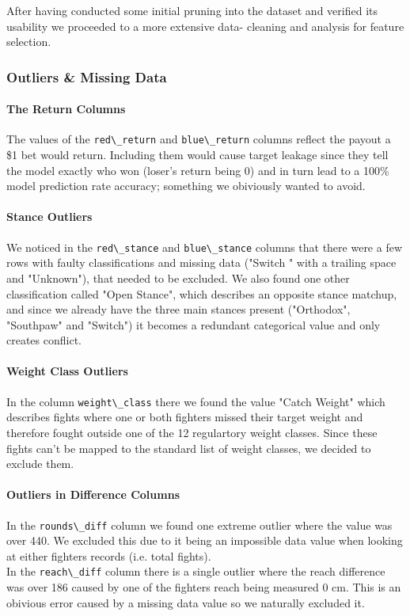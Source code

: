 \documentclass[11pt]{article}
\begin{document}
After having conducted some initial pruning into the dataset and verified its usability we proceeded to a more extensive data- cleaning and analysis for feature selection.

\subsubsection{Outliers \& Missing Data}

\paragraph*{The Return Columns}
The values of the \verb|red\_return| and \verb|blue\_return| columns reflect the payout a \$1 bet would return. Including them would cause target leakage since they tell the 
model exactly who won (loser's return being 0) and in turn lead to a 100\% model prediction rate accuracy; something we obiviously wanted to avoid.

\paragraph*{Stance Outliers}
We noticed in the \verb|red\_stance| and \verb|blue\_stance| columns that there were a few rows with faulty classifications and missing data ("Switch " with a trailing space and "Unknown"),
that needed to be excluded. We also found one other classification called "Open Stance", which describes an opposite stance matchup, and since we already have the three main stances present
("Orthodox", "Southpaw" and "Switch") it becomes a redundant categorical value and only creates conflict.

\paragraph*{Weight Class Outliers}
In the column \verb|weight\_class| there we found the value "Catch Weight" which describes fights where one or both fighters missed their target weight and therefore fought outside 
one of the 12 regulartory weight classes. Since these fights can't be mapped to the standard list of weight classes, we decided to exclude them.

\paragraph*{Outliers in Difference Columns}
In the \verb|rounds\_diff| column we found one extreme outlier where the value was over 440. We excluded this due to it being an impossible data value when
looking at either fighters records (i.e. total fights).\\
In the \verb|reach\_diff| column there is a single outlier where the reach difference was over 186 caused by one of the fighters reach being measured 0 cm.
This is an obivious error caused by a missing data value so we naturally excluded it.
\end{document}
